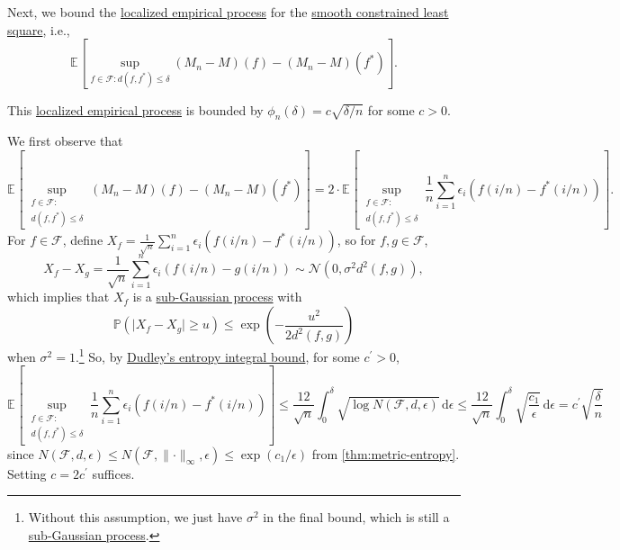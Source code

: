 Next, we bound the \hyperref[def:localized-EP]{localized empirical process} for the \hyperref[prb:smooth-LS]{smooth constrained least square}, i.e.,
\[
	\mathbb{E}_{}\left[\sup _{f\in \mathscr{F} \colon d(f, f^{\ast} ) \leq \delta } (M_n - M)(f) - (M_n - M)(f^{\ast} ) \right].
\]

\begin{claim}
	This \hyperref[def:localized-EP]{localized empirical process} is bounded by \(\phi _n (\delta ) = c \sqrt{\delta / n} \) for some \(c >0\).
\end{claim}
\begin{explanation}
	We first observe that
	\[
		\mathbb{E}_{}\left[\sup _{\substack{f\in \mathscr{F} \colon \\ d(f, f^{\ast} ) \leq \delta } } (M_n - M)(f) - (M_n - M)(f^{\ast} ) \right]
		= 2 \cdot \mathbb{E}_{}\left[\sup _{\substack{f\in \mathscr{F} \colon \\ d(f, f^{\ast} ) \leq \delta } } \frac{1}{n} \sum_{i=1}^{n} \epsilon _i \left( f (i / n) - f^{\ast} (i / n) \right) \right] .
	\]
	For \(f\in \mathscr{F} \), define \(X_f = \frac{1}{\sqrt{n} } \sum_{i=1}^{n} \epsilon _i \left( f (i / n) - f^{\ast} (i / n)  \right) \), so for \(f, g\in \mathscr{F} \),
	\[
		X_f - X_g = \frac{1}{\sqrt{n} } \sum_{i=1}^{n} \epsilon _i \left( f (i / n) - g(i / n)  \right) \sim \mathcal{N} ( 0, \sigma ^2 d^2(f, g) ) ,
	\]
	which implies that \(X_f\) is a \hyperref[def:sub-Gaussian-process]{sub-Gaussian process} with
	\[
		\mathbb{P} ( \vert X_f - X_g \vert \geq u) \leq \exp \left( - \frac{u^2}{2 d^2(f, g)} \right)
	\]
	when \(\sigma ^2 = 1\).\footnote{Without this assumption, we just have \(\sigma ^2\) in the final bound, which is still a \hyperref[def:sub-Gaussian-process]{sub-Gaussian process}.} So, by \hyperref[col:Dudley-integral-entropy-bound]{Dudley's entropy integral bound}, for some \(c^{\prime} > 0\),
	\[
		\mathbb{E}_{}\left[\sup _{\substack{f\in \mathscr{F} \colon                                                                                              \\ d(f, f^{\ast} ) \leq \delta } } \frac{1}{n} \sum_{i=1}^{n} \epsilon _i \left( f (i / n) - f^{\ast} (i / n) \right) \right]
		\leq \frac{12}{\sqrt{n} } \int_{0}^{\delta } \sqrt{\log N (\mathscr{F} , d, \epsilon )}  \,\mathrm{d}\epsilon
		\leq \frac{12}{\sqrt{n} } \int_{0}^{\delta } \sqrt{\frac{c_1}{\epsilon } }  \,\mathrm{d}\epsilon
		= c^{\prime} \sqrt{\frac{\delta}{n}}
	\]
	since \(N(\mathscr{F} , d, \epsilon ) \leq N(\mathscr{F} , \lVert \cdot \rVert _\infty , \epsilon ) \leq \exp (c_1 / \epsilon )\) from \autoref{thm:metric-entropy}. Setting \(c = 2c^{\prime} \) suffices.
\end{explanation}

